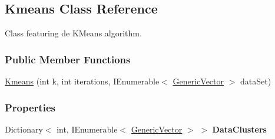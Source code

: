 \hypertarget{classDataTools_1_1clustering_1_1Kmeans}{}\subsection{Kmeans Class Reference}
\label{classDataTools_1_1clustering_1_1Kmeans}


Class featuring de K\+Means algorithm.  


\subsubsection*{Public Member Functions}
\begin{DoxyCompactItemize}
\item 
\hyperlink{classDataTools_1_1clustering_1_1Kmeans_a0104b68b82ac185d65d0df9a02569ec8_a0104b68b82ac185d65d0df9a02569ec8}{Kmeans} (int k, int iterations, I\+Enumerable$<$ \hyperlink{classDataTools_1_1GenericVector}{Generic\+Vector} $>$ data\+Set)
\end{DoxyCompactItemize}
\subsubsection*{Properties}
\begin{DoxyCompactItemize}
\item 
\mbox{\label{classDataTools_1_1clustering_1_1Kmeans_a06317119faad60c7efd9feabeb13c795}} 
Dictionary$<$ int, I\+Enumerable$<$ \hyperlink{classDataTools_1_1GenericVector}{Generic\+Vector} $>$ $>$ {\bfseries Data\+Clusters}
\end{DoxyCompactItemize}
